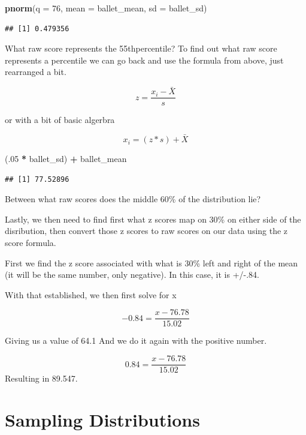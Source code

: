 \documentclass[]{book}
\newenvironment{Shaded}{\begin{snugshade}}{\end{snugshade}}
\newcommand{\KeywordTok}[1]{\textcolor[rgb]{0.13,0.29,0.53}{\textbf{#1}}}
\newcommand{\DataTypeTok}[1]{\textcolor[rgb]{0.13,0.29,0.53}{#1}}
\newcommand{\DecValTok}[1]{\textcolor[rgb]{0.00,0.00,0.81}{#1}}
\newcommand{\StringTok}[1]{\textcolor[rgb]{0.31,0.60,0.02}{#1}}
\newcommand{\OperatorTok}[1]{\textcolor[rgb]{0.81,0.36,0.00}{\textbf{#1}}}
\newcommand{\NormalTok}[1]{#1}
\theoremstyle{definition}
\theoremstyle{definition}
\theoremstyle{definition}
\theoremstyle{remark}
\begin{document}
\begin{Shaded}
\begin{Highlighting}[]
\KeywordTok{pnorm}\NormalTok{(}\DataTypeTok{q =} \DecValTok{76}\NormalTok{, }\DataTypeTok{mean =}\NormalTok{ ballet_mean, }\DataTypeTok{sd =}\NormalTok{  ballet_sd)}
\end{Highlighting}
\end{Shaded}

\begin{verbatim}
## [1] 0.479356
\end{verbatim}

What raw score represents the 55thpercentile? To find out what raw score
represents a percentile we can go back and use the formula from above,
just rearranged a bit.

\[z =  \frac{x_i - \bar{X}}{s}\]

or with a bit of basic algerbra

\[x_i = (z * s) + \bar{X}\]

\begin{Shaded}
\begin{Highlighting}[]
\NormalTok{(.}\DecValTok{05} \OperatorTok{*}\StringTok{ }\NormalTok{ballet_sd) }\OperatorTok{+}\StringTok{ }\NormalTok{ballet_mean}
\end{Highlighting}
\end{Shaded}

\begin{verbatim}
## [1] 77.52896
\end{verbatim}

Between what raw scores does the middle 60\% of the distribution lie?

Lastly, we then need to find first what z scores map on 30\% on either
side of the disribution, then convert those z scores to raw scores on
our data using the z score formula.

First we find the z score associated with what is 30\% left and right of
the mean (it will be the same number, only negative). In this case, it
is +/-.84.

With that established, we then first solve for x

\[-0.84 = \frac{x - 76.78}{15.02}\]

Giving us a value of 64.1 And we do it again with the positive number.

\[0.84 = \frac{x - 76.78}{15.02}\] Resulting in 89.547.

\chapter{Sampling Distributions}\label{sampling-distributions}
\end{document}
